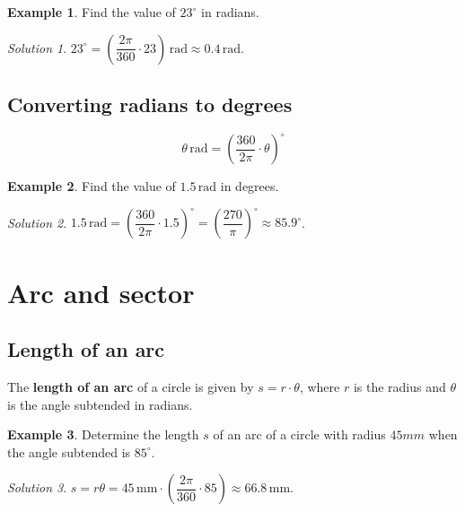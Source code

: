\documentclass[
  12pt,
  oneside]{book}
\theoremstyle{definition}
\theoremstyle{definition}
\newtheorem{example}{Example}[chapter]
\theoremstyle{definition}
\theoremstyle{definition}
\theoremstyle{remark}
\newtheorem*{solution}{Solution}
\begin{document}
\begin{example}
Find the value of \(23^\circ\) in radians.
\end{example}

\begin{solution}
\(23^\circ = \left(\dfrac{2\pi}{360}\cdot 23\right)\,\mathrm{rad} \approx 0.4\,\mathrm{rad}\).
\end{solution}

\hypertarget{converting-radians-to-degrees}{%
\subsection{Converting radians to degrees}\label{converting-radians-to-degrees}}

\[\theta\,\mathrm{rad}=\left(\dfrac{360}{2\pi}\cdot\theta\right)^\circ\]

\begin{example}
Find the value of \(1.5\,\mathrm{rad}\) in degrees.
\end{example}

\begin{solution}
\(1.5\,\mathrm{rad} = \left(\dfrac{360}{2\pi}\cdot 1.5\right)^\circ = \left(\dfrac{270}{\pi}\right)^\circ \approx 85.9^\circ\).
\end{solution}

\hypertarget{arc-and-sector}{%
\section{Arc and sector}\label{arc-and-sector}}

\hypertarget{length-of-an-arc}{%
\subsection{Length of an arc}\label{length-of-an-arc}}

The \textbf{length of an arc} of a circle is given by \(s=r\cdot\theta\), where \(r\) is the radius and \(\theta\) is the angle subtended in radians.

\begin{example}
Determine the length \(s\) of an arc of a circle with radius \(45mm\) when the angle subtended is \(85^\circ\).
\end{example}

\begin{solution}
\(s=r\theta = 45\,\mathrm{mm}\cdot\left(\dfrac{2\pi}{360}\cdot 85\right) \approx 66.8\,\mathrm{mm}\).
\end{solution}
\end{document}
